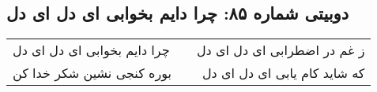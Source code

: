 \begin{center}
\section*{دوبیتی شماره ۸۵: چرا دایم بخوابی ای دل ای دل}
\label{sec:085}
\begin{longtable}{l p{0.5cm} r}
چرا دایم بخوابی ای دل ای دل
&&
ز غم در اضطرابی ای دل ای دل
\\
بوره کنجی نشین شکر خدا کن
&&
که شاید کام یابی ای دل ای دل
\\
\end{longtable}
\end{center}
